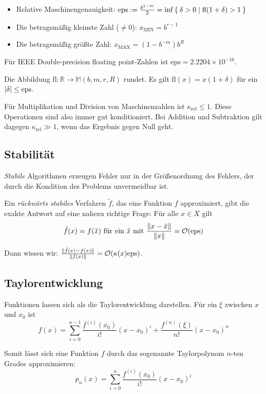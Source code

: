 \documentclass[a4paper,parskip=half*,DIV=15,fontsize=11pt]{scrartcl}
\DeclarePairedDelimiter\abs{\lvert}{\rvert}
\DeclarePairedDelimiter\norm{\lVert}{\rVert}
\newcommand{\fl}{\mathrm{fl}}
\newcommand{\eps}{\mathrm{eps}}
\begin{document}
\begin{itemize}
  \item Relative Maschinengenauigkeit: $\eps := \frac{b^{1-m}}{2} = \inf \Set{ \delta > 0 | \fl(1 + \delta) > 1 }$
  \item Die betragsmäßig kleinste Zahl ($\neq 0$): $x_\mathrm{MIN} = b^{r-1}$
  \item Die betragsmäßig größte Zahl: $x_\mathrm{MAX} = (1 - b^{-m}) b^R$
\end{itemize}

Für IEEE Double-precision floating point-Zahlen ist $\eps = 2.2204 \times 10^{-16}$.

Die Abbildung $\fl : \mathbb{R} \to \mathbb{M}(b,m,r,R)$ rundet. Es gilt $\fl(x) = x (1 + \delta)$ für ein $\abs \delta \leq \eps$.

Für Multiplikation und Division von Maschinenzahlen ist $\kappa_\text{rel} \leq 1$. Diese Operationen sind also immer gut konditioniert. Bei Addition und Subtraktion gilt dagegen $\kappa_\text{rel} \gg 1$, wenn das Ergebnis gegen Null geht.

\subsection{Stabilität}

\emph{Stabile} Algorithmen erzeugen Fehler nur in der Größenordnung des Fehlers, der durch die Kondition des Problems unvermeidbar ist.

Ein \emph{rückwärts stabiles} Verfahren $\tilde{f}$, das eine Funktion $f$ approximiert, gibt die exakte Antwort auf eine nahezu richtige Frage: Für alle $x \in X$ gilt
\[ \tilde{f}(x) = f(\tilde{x}) \text{ für ein } \tilde{x} \text{ mit } \frac{\norm{x-\tilde{x}}}{\norm{x}} = \mathcal{O}(\eps) \]

Dann wissen wir: $\frac{\norm{\tilde{f}(x) - f(x)}}{\norm{f(x)}} = \mathcal{O}(\kappa(x) \eps)$.

\subsection{Taylorentwicklung}

Funktionen lassen sich als die Taylorentwicklung darstellen. Für ein $\xi$ zwischen $x$ und $x_0$ ist
\[f(x) = \sum_{i=0}^{n-1} \frac{f^{(i)}(x_0)}{i!}(x-x_0)^i + \frac{f^{(n)}(\xi)}{n!}(x-x_0)^n\]

Somit lässt sich eine Funktion $f$ durch das sogenannte Taylorpolynom $n$-ten Grades approximieren:
\[p_n(x) = \sum_{i=0}^{n} \frac{f^{(i)}(x_0)}{i!}(x-x_0)^i\]
\end{document}
